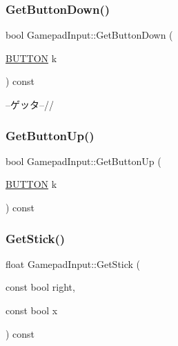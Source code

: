 \mbox{\label{class_gamepad_input_a7e7a0e3d48ce3f91332fd52c4c92bb8f}} 
\subsubsection{\texorpdfstring{Get\+Button\+Down()}{GetButtonDown()}}
{\footnotesize\ttfamily bool Gamepad\+Input\+::\+Get\+Button\+Down (\begin{DoxyParamCaption}\item[{\mbox{\hyperlink{gamepad__input_8h_a739845b0076428add52ca3cec492e705}{B\+U\+T\+T\+ON}}}]{k }\end{DoxyParamCaption}) const\hspace{0.3cm}{\ttfamily [inline]}}



--ゲッタ--// 

\mbox{\label{class_gamepad_input_a2c013028c4e0983a957666ff9922a40c}} 
\subsubsection{\texorpdfstring{Get\+Button\+Up()}{GetButtonUp()}}
{\footnotesize\ttfamily bool Gamepad\+Input\+::\+Get\+Button\+Up (\begin{DoxyParamCaption}\item[{\mbox{\hyperlink{gamepad__input_8h_a739845b0076428add52ca3cec492e705}{B\+U\+T\+T\+ON}}}]{k }\end{DoxyParamCaption}) const\hspace{0.3cm}{\ttfamily [inline]}}

\mbox{\label{class_gamepad_input_ab7e3fb80f81fcafdfc7c0f546c280929}} 
\subsubsection{\texorpdfstring{Get\+Stick()}{GetStick()}}
{\footnotesize\ttfamily float Gamepad\+Input\+::\+Get\+Stick (\begin{DoxyParamCaption}\item[{const bool}]{right,  }\item[{const bool}]{x }\end{DoxyParamCaption}) const\hspace{0.3cm}{\ttfamily [inline]}}

